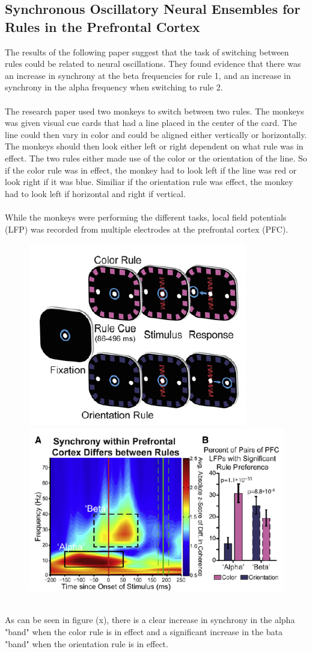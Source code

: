 \subsection{Synchronous Oscillatory Neural Ensembles
for Rules in the Prefrontal Cortex}
The results of the following paper suggest that the task of switching between rules could be related to neural oscillations. They found evidence that there was an increase in synchrony at the beta frequencies for rule 1, and an increase in synchrony in the alpha frequency when switching to rule 2.
\\
\\
The research paper used two monkeys to switch between two rules. The monkeys was given visual cue cards that had a line placed in the center of the card. The line could then vary in color and could be aligned either vertically or horizontally. The monkeys should then look either left or right dependent on what rule was in effect. The two rules either made use of the color or the orientation of the line. So if the color rule was in effect, the monkey had to look left if the line was red or look right if it was blue. Similiar if the orientation rule was effect, the monkey had to look left if horizontal and right if vertical.
\\
\\
While the monkeys were performing the different tasks, local field potentials (LFP) was recorded from multiple electrodes at the prefrontal cortex (PFC).
\begin{figure}[!ht]
\centering
\includegraphics[scale=0.5]{MonkeyRules}
\includegraphics[scale=0.5]{MonkeyResults}
\caption{}
\end{figure}
\\
As can be seen in figure (x), there is a clear increase in synchrony in the alpha "band" when the color rule is in effect and a significant increase in the bata "band" when the orientation rule is in effect.
%